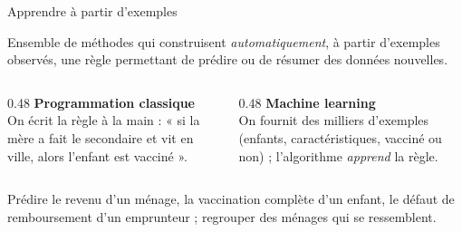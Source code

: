 \documentclass[aspectratio=169,11pt]{beamer}
\begin{document}
\begin{frame}{Apprendre à partir d'exemples}
  \begin{definition}
    Ensemble de méthodes qui construisent \emph{automatiquement}, à partir d'exemples observés, une règle permettant de prédire ou de résumer des données nouvelles.
  \end{definition}
  \begin{columns}[T]
    \begin{column}{0.48\textwidth}
      \textbf{Programmation classique}\\[1mm]
      {\small On écrit la règle à la main : « si la mère a fait le secondaire et vit en ville, alors l'enfant est vacciné ».}
    \end{column}
    \begin{column}{0.48\textwidth}
      \textbf{Machine learning}\\[1mm]
      {\small On fournit des milliers d'exemples (enfants, caractéristiques, vacciné ou non) ; l'algorithme \emph{apprend} la règle.}
    \end{column}
  \end{columns}
  \vskip3mm
  \begin{exemple}
    Prédire le revenu d'un ménage, la vaccination complète d'un enfant, le défaut de remboursement d'un emprunteur ; regrouper des ménages qui se ressemblent.
  \end{exemple}
\end{frame}
\end{document}
